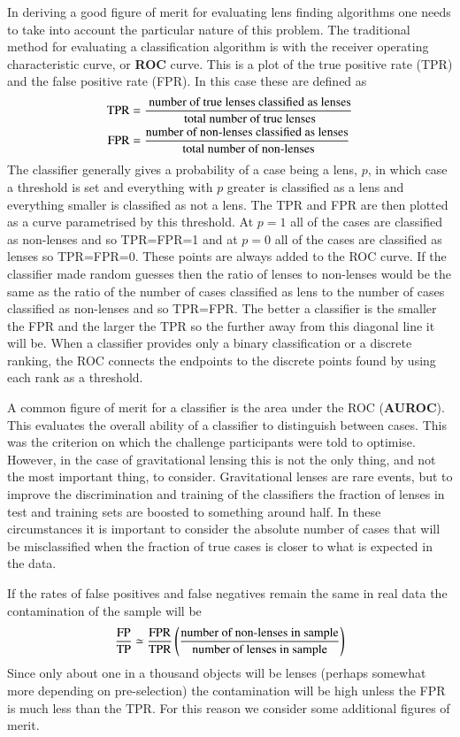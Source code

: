 \documentclass{aa}
\begin{document}
In deriving a good figure of merit for evaluating lens finding algorithms one needs to take into account the particular nature of this problem.
The traditional method for evaluating a classification algorithm is with the receiver operating characteristic curve, or {\bf ROC} curve.  This is a plot of the true positive rate (TPR) and the false positive rate (FPR).  In this case these are defined as
\begin{align}
{\rm TPR} &= \frac{\textrm{ number of true lenses classified as lenses}}{\textrm{ total number of true lenses}} \\
{\rm FPR} &= \frac{\textrm{number of non-lenses classified as lenses}}{\textrm{ total number of non-lenses}}
\end{align}
The classifier generally gives a probability of a case being a lens, $p$, in which case a threshold is set and everything with $p$ greater is classified as a lens and everything smaller is classified as not a lens.  The TPR and FPR are then plotted as a curve parametrised by this threshold.  At $p=1$ all of the cases are classified as non-lenses and so TPR=FPR=1 and at $p=0$ all of the cases are classified as lenses so TPR=FPR=0.  These points are always added to the ROC curve.  If the classifier made random guesses then the ratio of lenses to non-lenses would be the same as the ratio of the number of cases classified as lens to the number of cases classified as non-lenses and so TPR=FPR.  The better a classifier is the smaller the FPR and the larger the TPR so the further away from this diagonal line it will be.  When a classifier provides only a binary classification or a discrete ranking, the ROC connects the endpoints to the discrete points found by using each rank as a threshold.

A common figure of merit for a classifier is the area under the ROC ({\bf AUROC}).  This evaluates the overall ability of a classifier to distinguish between cases.  This was the criterion on which the challenge participants were told to optimise.  However, in the case of gravitational lensing this is not the only thing, and not the most important thing, to consider.  Gravitational lenses are rare events, but to improve the discrimination and training of the classifiers the fraction of lenses in test and training sets are boosted to something around half.  In these circumstances it is important to consider the absolute number of cases that will be misclassified when the fraction of true cases is closer to what is expected in the data.

If the rates of false positives and false negatives remain the same in real data  the contamination of the sample will be
\begin{align}
\frac{\rm FP}{\rm TP} \simeq \frac{\rm FPR}{\rm TPR} \left(\frac{\textrm{number of non-lenses in sample}}{\textrm{number of lenses in sample}} \right)
\end{align}
Since only about one in a thousand objects will be lenses (perhaps somewhat more depending on pre-selection) the contamination will be high unless the FPR is much less than the TPR.  For this reason we consider some additional figures of merit.
\end{document}
